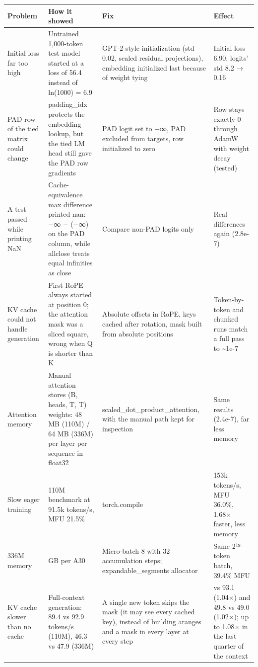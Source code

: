 \documentclass[11pt]{article}
\begin{document}
\begin{center}
\small
\begin{tabularx}{\linewidth}{>{\raggedright\arraybackslash}X>{\raggedright\arraybackslash}X>{\raggedright\arraybackslash}X>{\raggedright\arraybackslash}X}
\toprule
\textbf{Problem} & \textbf{How it showed} & \textbf{Fix} & \textbf{Effect} \\
\midrule
Initial loss far too high & Untrained 1,000-token test model started at a loss of 56.4 instead of ln(1000) = 6.9 & GPT-2-style initialization (std 0.02, scaled residual projections), embedding initialized last because of weight tying & Initial loss 6.90, logits' std 8.2 → 0.16 \\
PAD row of the tied matrix could change & padding\_\allowbreak{}idx protects the embedding lookup, but the tied LM head still gave the PAD row gradients & PAD logit set to −∞, PAD excluded from targets, row initialized to zero & Row stays exactly 0 through AdamW with weight decay (tested) \\
A test passed while printing NaN & Cache-equivalence max difference printed nan: −∞ − (−∞) on the PAD column, while allclose treats equal infinities as close & Compare non-PAD logits only & Real differences again (2.8e-7) \\
KV cache could not handle generation & First RoPE always started at position 0; the attention mask was a sliced square, wrong when Q is shorter than K & Absolute offsets in RoPE, keys cached after rotation, mask built from absolute positions & Token-by-token and chunked runs match a full pass to \textasciitilde{}1e-7 \\
Attention memory & Manual attention stores (B, heads, T, T) weights: 48 MB (110M) /\allowbreak{} 64 MB (336M) per layer per sequence in float32 & scaled\_\allowbreak{}dot\_\allowbreak{}product\_\allowbreak{}attention, with the manual path kept for inspection & Same results (2.4e-7), far less memory \\
Slow eager training & 110M benchmark at 91.5k tokens/\allowbreak{}s, MFU 21.5\% & torch.compile & 153k tokens/\allowbreak{}s, MFU 36.0\%, 1.68× faster, less memory \\
336M memory & 24 GB per A30 & Micro-batch 8 with 32 accumulation steps; expandable\_\allowbreak{}segments allocator & Same 2¹⁹-token batch, 39.4\% MFU \\
KV cache slower than no cache & Full-context generation: 89.4 vs 92.9 tokens/\allowbreak{}s (110M), 46.3 vs 47.9 (336M) & A single new token skips the mask (it may see every cached key), instead of building aranges and a mask in every layer at every step & 96.8 vs 93.1 (1.04×) and 49.8 vs 49.0 (1.02×); up to 1.08× in the last quarter of the context \\

\end{tabularx}
\end{center}
\end{document}

